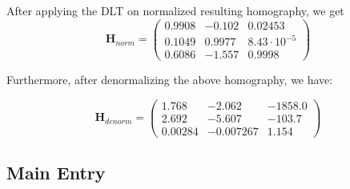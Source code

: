 \documentclass[conference]{IEEEtran}
\newcommand{\mat}[1]{\mathbf{#1}} %
\begin{document}
After applying the DLT on normalized resulting homography, we get
\begin{equation}
	\mat{H}_{norm} = 
	\begin{pmatrix}
		0.9908 & -0.102 & 0.02453\\ 0.1049 & 0.9977 & 8.43\cdot 10^{-5}\\ 0.6086 & -1.557 & 0.9998
	\end{pmatrix}
\end{equation}

Furthermore, after denormalizing the above homography, we have:

\begin{equation}
	\mat{H}_{denorm} = 
	\begin{pmatrix}
		1.768 & -2.062 & -1858.0\\ 2.692 & -5.607 & -103.7\\ 0.00284 & -0.007267 & 1.154
	\end{pmatrix}
\end{equation}

\newpage
\appendix
\subsection{Main Entry}










%
%
%
%
%




\end{document}
